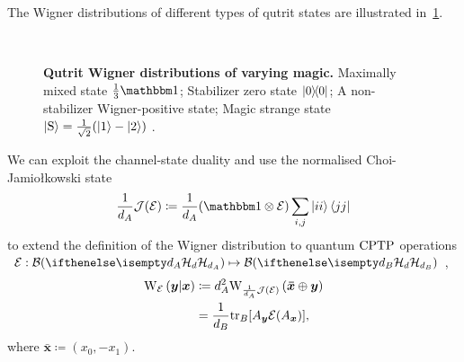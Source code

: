 \documentclass[pra,
aps,
twocolumn,
superscriptaddress,
groupedaddress,
nofootinbib,
reprint
]{revtex4-1}
\begin{document}
The Wigner distributions of different types of qutrit states are illustrated in~\cref{fig:wstate_examples}.
\begin{figure}%
    \centering
    \hspace{8pt}%
    \\
    \hspace{8pt}%
    \caption{\textbf{Qutrit Wigner distributions of varying magic.} 
     Maximally mixed state $\frac{1}{3}\id$;  Stabilizer zero state $\ketbra{0}{0}$;  A non-stabilizer Wigner-positive state;  Magic strange state $\ket{{\rm{S}}} = \frac{1}{\sqrt{2}}(\ket{1} - \ket{2})$ .
    }%
    \label{fig:wstate_examples}
\end{figure}

We can exploit the channel-state duality and use the normalised Choi-Jamio\l{}kowski state 
\begin{equation}\label{eq:cj}
    \frac{1}{d_A}\J(\E) \coloneqq \frac{1}{d_A}(\id \otimes \E) \sum_{i,j} \ket{ii}\bra{jj}
\end{equation}
to extend the definition of the Wigner distribution to quantum ${\rm{CPTP}}$ operations $\E: \cal{B}(\hd[d_A]) \mapsto \cal{B}(\hd[d_B])$, 
\begin{align}\label{eq:woperation}
    \W[\bmy|\bmx]{\E} 
    &\coloneqq d_A^2 \W[\bm{\bar x} \oplus \bmy]{\frac{1}{d_A}\J(\E)} \\
    &= \frac{1}{d_B} \tr_B[A_{\bmy} \E(A_{\bmx})],
\end{align}
where $\bm{\bar x} \coloneqq (x_0, -x_1)$.
\end{document}
